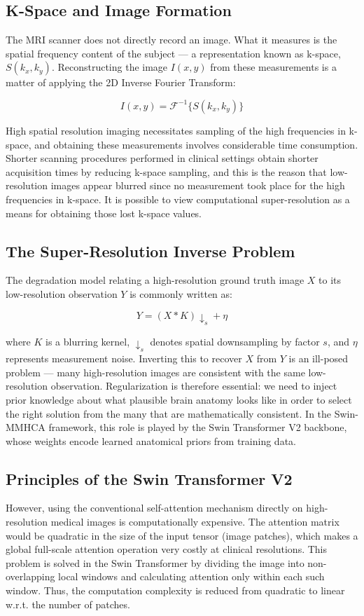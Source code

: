 \subsection{K-Space and Image Formation}
The MRI scanner does not directly record an image. What it measures is the spatial frequency content of the subject — a representation known as k-space, $S(k_x, k_y)$. Reconstructing the image $I(x, y)$ from these measurements is a matter of applying the 2D Inverse Fourier Transform:

\begin{equation}
    I(x, y) = \mathcal{F}^{-1}\{S(k_x, k_y)\}
\end{equation}

High spatial resolution imaging necessitates sampling of the high frequencies in k-space, and obtaining these measurements involves considerable time consumption. Shorter scanning procedures performed in clinical settings obtain shorter acquisition times by reducing k-space sampling, and this is the reason that low-resolution images appear blurred since no measurement took place for the high frequencies in k-space. It is possible to view computational super-resolution as a means for obtaining those lost k-space values.

\subsection{The Super-Resolution Inverse Problem}
The degradation model relating a high-resolution ground truth image $X$ to its low-resolution observation $Y$ is commonly written as:

\begin{equation}
    Y = (X \ast K) \downarrow_s + \eta
\end{equation}

where $K$ is a blurring kernel, $\downarrow_s$ denotes spatial downsampling by factor $s$, and $\eta$ represents measurement noise. Inverting this to recover $X$ from $Y$ is an ill-posed problem — many high-resolution images are consistent with the same low-resolution observation. Regularization is therefore essential: we need to inject prior knowledge about what plausible brain anatomy looks like in order to select the right solution from the many that are mathematically consistent. In the Swin-MMHCA framework, this role is played by the Swin Transformer V2 backbone, whose weights encode learned anatomical priors from training data.

\subsection{Principles of the Swin Transformer V2}
However, using the conventional self-attention mechanism directly on high-resolution medical images is computationally expensive. The attention matrix would be quadratic in the size of the input tensor (image patches), which makes a global full-scale attention operation very costly at clinical resolutions. This problem is solved in the Swin Transformer by dividing the image into non-overlapping local windows and calculating attention only within each such window. Thus, the computation complexity is reduced from quadratic to linear w.r.t. the number of patches.

